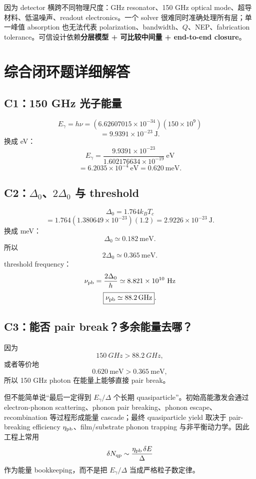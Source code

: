 \documentclass[11pt,a4paper,openany]{ctexrep}
\begin{document}
因为 detector 横跨不同物理尺度：GHz resonator、150 GHz optical mode、超导材料、低温噪声、readout electronics。一个 solver 很难同时准确处理所有层；单一峰值 absorption 也无法代表 polarization、bandwidth、$Q$、NEP、fabrication tolerance。可信设计依赖\textbf{分层模型 + 可比较中间量 + end-to-end closure}。

\section{综合闭环题详细解答}

\subsection*{C1：150 GHz 光子能量}

\[
E_\gamma=h\nu
=(6.62607015\times10^{-34})(150\times10^9)
\]
\[
=9.9391\times10^{-23}\ \mathrm{J}.
\]
换成 eV：
\[
E_\gamma
=\frac{9.9391\times10^{-23}}{1.602176634\times10^{-19}}\ \mathrm{eV}
\]
\[
=6.2035\times10^{-4}\ \mathrm{eV}
=\boxed{0.620\ \mathrm{meV}}.
\]

\subsection*{C2：$\Delta_0$、$2\Delta_0$ 与 threshold}

\[
\Delta_0=1.764k_BT_c
\]
\[
=1.764(1.380649\times10^{-23})(1.2)
=2.9226\times10^{-23}\ \mathrm{J}.
\]
换成 meV：
\[
\boxed{\Delta_0\simeq0.182\ \mathrm{meV}}.
\]
所以
\[
\boxed{2\Delta_0\simeq0.365\ \mathrm{meV}}.
\]
threshold frequency：
\[
\nu_{\rm pb}=\frac{2\Delta_0}{h}
\simeq8.821\times10^{10}\ \mathrm{Hz}
\]
\[
\boxed{\nu_{\rm pb}\simeq\SI{88.2}{GHz}}.
\]

\subsection*{C3：能否 pair break？多余能量去哪？}

因为
\[
\SI{150}{GHz}>\SI{88.2}{GHz},
\]
或者等价地
\[
0.620\ \mathrm{meV}>0.365\ \mathrm{meV},
\]
所以 150 GHz photon 在能量上能够直接 pair break。

但不能简单说“最后一定得到 $E_\gamma/\Delta$ 个长期 quasiparticle”。初始高能激发会通过 electron-phonon scattering、phonon pair breaking、phonon escape、recombination 等过程形成能量 cascade；最终 quasiparticle yield 取决于 pair-breaking efficiency $\eta_{\rm pb}$、film/substrate phonon trapping 与非平衡动力学。因此工程上常用
\[
\delta N_{\rm qp}\sim\frac{\eta_{\rm pb}\,\delta E}{\Delta}
\]
作为能量 bookkeeping，而不是把 $E_\gamma/\Delta$ 当成严格粒子数定律。
\end{document}
